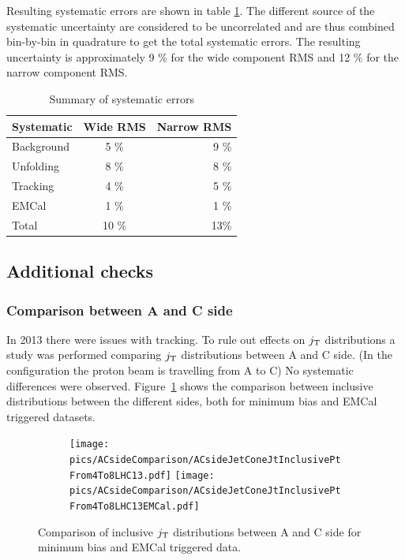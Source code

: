Resulting systematic errors are shown in table \ref{tab:systematics}. The different source of the systematic uncertainty are considered to be uncorrelated and are thus combined bin-by-bin in quadrature to get the total systematic errors.  The resulting uncertainty is approximately 9 \% for the wide component RMS and 12 \% for the narrow component RMS. 
\begin{table}[htb]
\centering
\caption{Summary of systematic errors}
\label{tab:systematics}
\begin{tabular}{ l | c | r }
  Systematic & Wide RMS & Narrow RMS \\
    \hline			
  Background & 5 \% & 9 \% \\
  Unfolding & 8 \% & 8 \% \\
  Tracking & 4 \% & 5 \% \\ 
  EMCal & 1 \% & 1 \% \\
  Total & 10 \% & 13\% \\
  \hline
  \end{tabular}
  \end{table}

  
\subsection{Additional checks}
\subsubsection{Comparison between A and C side}
In 2013 there were issues with tracking. To rule out effects on $j_{\rm T}$ distributions a study was performed comparing $j_{\rm T}$ distributions between A and C side. (In the \pPb configuration the proton beam is travelling from A to C) No systematic differences were observed. Figure~\ref{fig:AC} shows the comparison between inclusive distributions between the different sides, both for minimum bias and EMCal triggered datasets.

\begin{figure}
\centering
\begin{subfigure}{0.95\textwidth}
\texttt{[image: pics/ACsideComparison/ACsideJetConeJtInclusivePtFrom4To8LHC13.pdf]}
\texttt{[image: pics/ACsideComparison/ACsideJetConeJtInclusivePtFrom4To8LHC13EMCal.pdf]}
\end{subfigure}
\caption{Comparison of inclusive $j_{\rm T}$ distributions between A and C side for minimum bias and EMCal triggered data.}
\label{fig:AC}
\end{figure}

